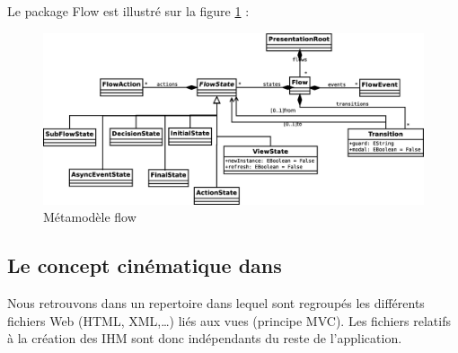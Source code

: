 \begin{itemize}
Le package Flow est illustré sur la figure \ref{fig:flow} :

\begin{figure}[H]
  \centering
  \includegraphics[scale=.3]{img/flow.eps}
  \caption{Métamodèle flow}
  \label{fig:flow}
\end{figure}

\end{itemize}


\subsection{Le concept cinématique dans \kwplay{}}
Nous retrouvons dans \kwplay{} un repertoire dans lequel sont regroupés les différents fichiers Web (HTML, XML,\dots) liés aux vues (principe MVC). Les fichiers relatifs à la création des \textsc{IHM} sont donc indépendants du reste de l'application.   

